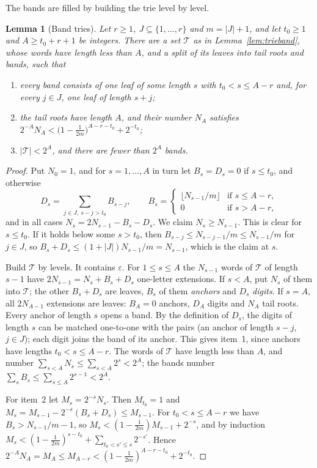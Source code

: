 \documentclass[11pt]{article}
\newtheorem{lemma}[theorem]{Lemma}
\theoremstyle{remark}
\begin{document}
The bands are filled by building the trie level by level.

\begin{lemma}[Band tries]\label{lem:bandtrie}
Let $r\ge1$, $J\subseteq\{1,\dots,r\}$ and $m=|J|+1$, and let $t_0\ge1$ and
$A\ge t_0+r+1$ be integers.  There are a set $\mathcal T$ as in Lemma~\ref{lem:trieband},
whose words have length less than $A$, and a split of its leaves into tail roots and
bands, such that
\begin{enumerate}
\item every band consists of one leaf of some length $s$ with $t_0<s\le A-r$ and, for
every $j\in J$, one leaf of length $s+j$;
\item the tail roots have length $A$, and their number $N_A$ satisfies
$2^{-A}N_A<\bigl(1-\frac1{2m}\bigr)^{A-r-t_0}+2^{-t_0}$;
\item $|\mathcal T|<2^A$, and there are fewer than $2^A$ bands.
\end{enumerate}
\end{lemma}

\begin{proof}
Put $N_0=1$, and for $s=1,\dots,A$ in turn let $B_s=D_s=0$ if $s\le t_0$, and otherwise
\[
 D_s=\sum_{j\in J,\ s-j>t_0}B_{s-j},\qquad
 B_s=\begin{cases}\lfloor N_{s-1}/m\rfloor&\text{if }s\le A-r,\\0&\text{if }s>A-r,\end{cases}
\]
and in all cases $N_s=2N_{s-1}-B_s-D_s$.  We claim $N_s\ge N_{s-1}$.  This is clear for
$s\le t_0$.  If it holds below some $s>t_0$, then $B_{s-j}\le N_{s-j-1}/m\le N_{s-1}/m$
for $j\in J$, so $B_s+D_s\le(1+|J|)N_{s-1}/m=N_{s-1}$, which is the claim at $s$.

Build $\mathcal T$ by levels.  It contains $\varepsilon$.  For $1\le s\le A$ the $N_{s-1}$
words of $\mathcal T$ of length $s-1$ have $2N_{s-1}=N_s+B_s+D_s$ one-letter extensions.
If $s<A$, put $N_s$ of them into $\mathcal T$; the other $B_s+D_s$ are leaves, $B_s$ of
them \emph{anchors} and $D_s$ \emph{digits}.  If $s=A$, all $2N_{A-1}$ extensions are
leaves: $B_A=0$ anchors, $D_A$ digits and $N_A$ tail roots.  Every anchor of length $s$
opens a band.  By the definition of $D_s$, the digits of length $s$ can be matched
one-to-one with the pairs (an anchor of length $s-j$, $j\in J$); each digit joins the band
of its anchor.  This gives item~1, since anchors have lengths $t_0<s\le A-r$.  The words of
$\mathcal T$ have length less than $A$, and number $\sum_{s<A}N_s\le\sum_{s<A}2^s<2^A$; the
bands number $\sum_sB_s\le\sum_{s\le A}2^{s-1}<2^A$.

For item~2 let $M_s=2^{-s}N_s$.  Then $M_{t_0}=1$ and
$M_s=M_{s-1}-2^{-s}(B_s+D_s)\le M_{s-1}$.  For $t_0<s\le A-r$ we have
$B_s>N_{s-1}/m-1$, so $M_s<(1-\frac1{2m})M_{s-1}+2^{-s}$, and by induction
$M_s<(1-\frac1{2m})^{s-t_0}+\sum_{t_0<s'\le s}2^{-s'}$.  Hence
$2^{-A}N_A=M_A\le M_{A-r}<(1-\frac1{2m})^{A-r-t_0}+2^{-t_0}$.
\end{proof}
\end{document}
